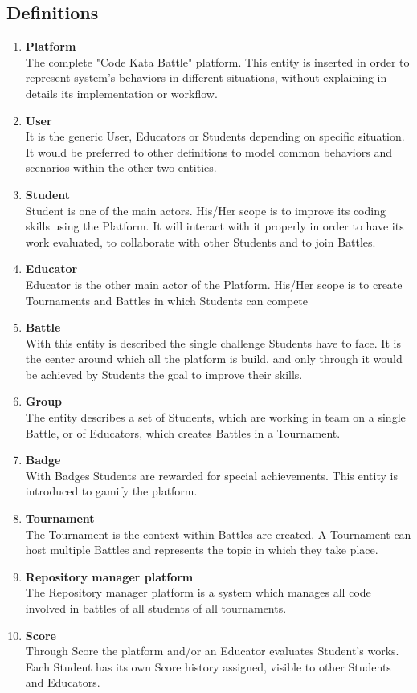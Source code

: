 \subsection{Definitions}
\begin{enumerate}[label=$\bullet$]
    \item \textbf{Platform}\\The complete "Code Kata Battle" platform. This entity is inserted in order to represent system's behaviors in different situations, without explaining in details its implementation or workflow.
    \item \textbf{User}\\It is the generic User, Educators or Students depending on specific situation. It would be preferred to other definitions to model common behaviors and scenarios within the other two entities.
    \item \textbf{Student}\\Student is one of the main actors. His/Her scope is to improve its coding skills using the Platform. It will interact with it properly in order to have its work evaluated, to collaborate with other Students and to join Battles.
    \item \textbf{Educator}\\Educator is the other main actor of the Platform. His/Her scope is to create Tournaments and Battles in which Students can compete
    \item \textbf{Battle}\\With this entity is described the single challenge Students have to face. It is the center around which all the platform is build, and only through it would be achieved by Students the goal to improve their skills.
    \item \textbf{Group}\\The entity describes a set of Students, which are working in team on a single Battle, or of Educators, which creates Battles in a Tournament.
    \item \textbf{Badge}\\With Badges Students are rewarded for special achievements. This entity is introduced to gamify the platform.
    \item \textbf{Tournament}\\The Tournament is the context within Battles are created. A Tournament can host multiple Battles and represents the topic in which they take place.
    \item \textbf{Repository manager platform}\\The Repository manager platform is a system which manages all code involved in battles of all students of all tournaments.
    \item \textbf{Score}\\Through Score the platform and/or an Educator evaluates Student's works. Each Student has its own Score history assigned, visible to other Students and Educators.
\end{enumerate}
